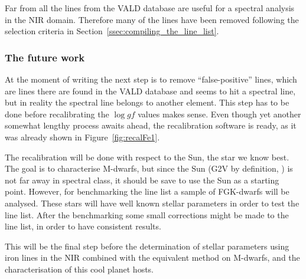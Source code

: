 \documentclass{aa}
\begin{document}
Far from all the lines from the VALD database are useful for a spectral
analysis in the NIR domain. Therefore many of the lines have been removed
following the selection criteria in Section~\ref{ssec:compiling_the_line_list}.

\subsubsection{The future work}
\label{ssub:the_future_work}
At the moment of writing the next step is to remove ``false-positive'' lines,
which are lines there are found in the VALD database and seems to hit a
spectral line, but in reality the spectral line belongs to another element.
This step has to be done before recalibrating the $\log gf$ values makes sense.
Even though yet another somewhat lengthy process awaits ahead, the
recalibration software is ready, as it was already shown in
Figure~\ref{fig:recalFe1}.

The recalibration will be done with respect to the Sun, the star we know best.
The goal is to characterise M-dwarfs, but since the Sun (G2V by definition,
\citet{Gray2006}) is not far away in spectral class, it should be save to use
the Sun as a starting point. However, for benchmarking the line list a sample
of FGK-dwarfs will be analysed. These stars will have well known stellar
parameters in order to test the line list. After the benchmarking some small
corrections might be made to the line list, in order to have consistent
results.

This will be the final step before the determination of stellar parameters
using iron lines in the NIR combined with the equivalent method on M-dwarfs,
and the characterisation of this cool planet hosts.


\newpage


\nocite*{}
\end{document}
